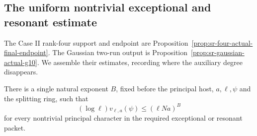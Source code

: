 \subsection{The uniform nontrivial exceptional and resonant estimate}
\label{subsec:sr-uniform-nontrivial-assembly}
The Case II rank-four support and endpoint are
Proposition~\ref{prop:sr-four-actual-final-endpoint}.
The Gaussian two-run output is
Proposition~\ref{prop:sr-gaussian-actual-g10}.
We assemble their estimates, recording where the
auxiliary degree disappears.

\begin{srproposition}\label{prop:sr-nontrivial-final-assembly}
There is a single natural exponent \(B\), fixed
before the principal host, \(a,\ell,\psi\) and the splitting
ring, such that
\[
                  (\log\ell)v_{\ell,a}(\psi)
                                      \le(\ell Na)^B
\]
for every nontrivial principal character in the required
exceptional or resonant packet.
\end{srproposition}
